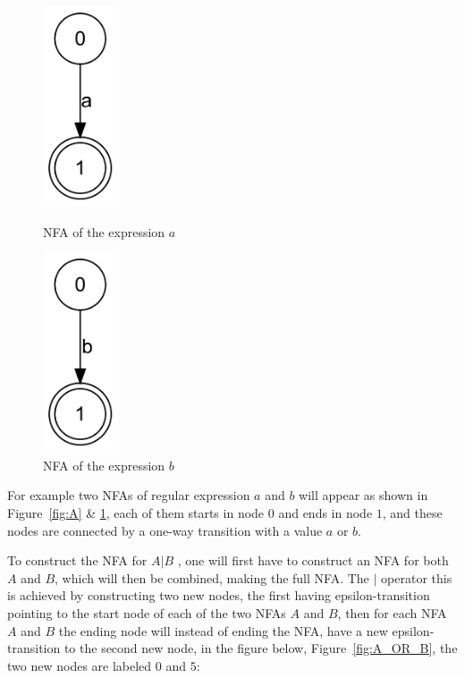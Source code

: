 \begin{figure}[h!]
  \centering
\begin{minipage}[b]{0.40\linewidth}
  \centering
      \includegraphics[width=0.2\textwidth]{lib/A.png}
  \caption{NFA of the expression $a$}
\label{fig:A}
  \end{minipage}
\begin{minipage}[b]{0.40\linewidth}

  \centering
      \includegraphics[width=0.2\textwidth]{lib/B.png}
  \caption{NFA of the expression $b$}
  \label{fig:B}

    \end{minipage}
\end{figure}


For example two NFAs of regular expression $a$ and $b$ will appear as shown in Figure~\ref{fig:A} \& \ref{fig:B}, each of them starts in node $0$ and ends in node $1$, and these nodes are connected by a one-way transition with a value $a$ or $b$. %

To construct the NFA for $A | B$ , one will first have to construct an NFA for both $A$ and $B$, which will then be combined, making the full NFA. The $|$ operator this is achieved by constructing two new nodes, the first having epsilon-transition pointing to the start node of each of the two NFAs $A$ and $B$, then for each NFA $A$ and $B$ the ending node will instead of ending the NFA, have a new epsilon-transition to the second new node, in the figure below, Figure~\ref{fig:A_OR_B}, the two new nodes are labeled $0$ and $5$:


